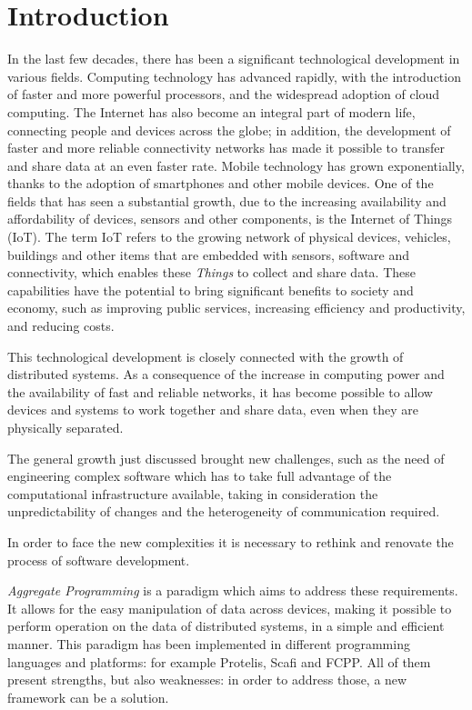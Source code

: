 \chapter{Introduction}\label{chapter:introduction}
In the last few decades, there has been a significant technological development in various fields.
Computing technology has advanced rapidly, with the introduction of faster and more powerful processors, and the widespread adoption of cloud computing.\newline
The Internet has also become an integral part of modern life, connecting people and devices across the globe; in addition, the development of faster and more reliable connectivity networks has made it possible to transfer and share data at an even faster rate.\newline
Mobile technology has grown exponentially, thanks to the adoption of smartphones and other mobile devices.\newline
One of the fields that has seen a substantial growth, due to the increasing availability and affordability of devices, sensors and other components, is the Internet of Things (IoT). The term IoT refers to the growing network of physical devices, vehicles, buildings and other items that are embedded with sensors, software and connectivity, which enables these \textit{Things} to collect and share data. These capabilities have the potential to bring significant benefits to society and economy, such as improving public services, increasing efficiency and productivity, and reducing costs.

This technological development is closely connected with the growth of distributed systems. As a consequence of the increase in computing power and the availability of fast and reliable networks, it has become possible to allow devices and systems to work together and share data, even when they are physically separated.

The general growth just discussed brought new challenges, such as the need of engineering complex software which has to take full advantage of the computational infrastructure available, taking in consideration the unpredictability of changes and the heterogeneity of communication required.

In order to face the new complexities it is necessary to rethink and renovate the process of software development.

\textit{Aggregate Programming} is a paradigm which aims to address these requirements. It allows for the easy manipulation of data across devices, making it possible to perform operation on the data of distributed systems, in a simple and efficient manner.\newline
This paradigm has been implemented in different programming languages and platforms: for example Protelis, Scafi and FCPP.\newline
All of them present strengths, but also weaknesses: in order to address those, a new framework can be a solution.

